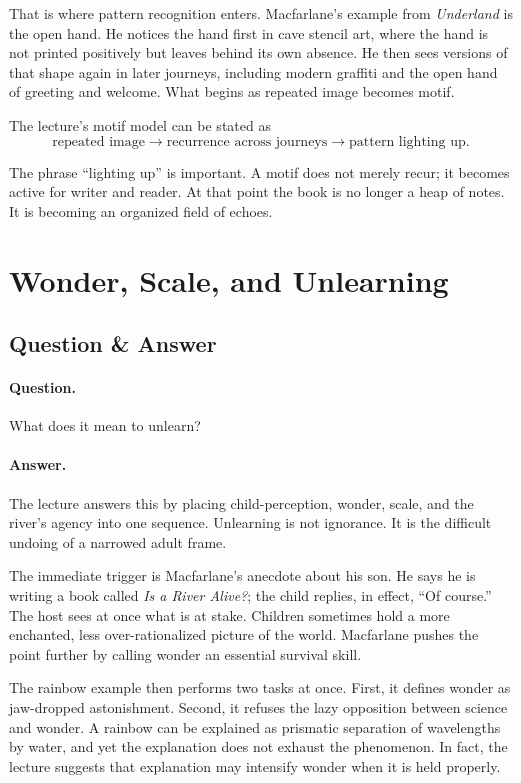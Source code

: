 That is where pattern recognition enters. Macfarlane's example from \emph{Underland} is the open hand. He notices the hand first in cave stencil art, where the hand is not printed positively but leaves behind its own absence. He then sees versions of that shape again in later journeys, including modern graffiti and the open hand of greeting and welcome. What begins as repeated image becomes motif.

The lecture's motif model can be stated as
\begin{equation}
\text{repeated image} \longrightarrow \text{recurrence across journeys} \longrightarrow \text{pattern lighting up}.
\end{equation}

The phrase ``lighting up'' is important. A motif does not merely recur; it becomes active for writer and reader. At that point the book is no longer a heap of notes. It is becoming an organized field of echoes.

\section{Wonder, Scale, and Unlearning}

\subsection{Question \& Answer}

\paragraph{Question.} What does it mean to unlearn?

\paragraph{Answer.} The lecture answers this by placing child-perception, wonder, scale, and the river's agency into one sequence. Unlearning is not ignorance. It is the difficult undoing of a narrowed adult frame.

The immediate trigger is Macfarlane's anecdote about his son. He says he is writing a book called \emph{Is a River Alive?}; the child replies, in effect, ``Of course.'' The host sees at once what is at stake. Children sometimes hold a more enchanted, less over-rationalized picture of the world. Macfarlane pushes the point further by calling wonder an essential survival skill.

The rainbow example then performs two tasks at once. First, it defines wonder as jaw-dropped astonishment. Second, it refuses the lazy opposition between science and wonder. A rainbow can be explained as prismatic separation of wavelengths by water, and yet the explanation does not exhaust the phenomenon. In fact, the lecture suggests that explanation may intensify wonder when it is held properly.


